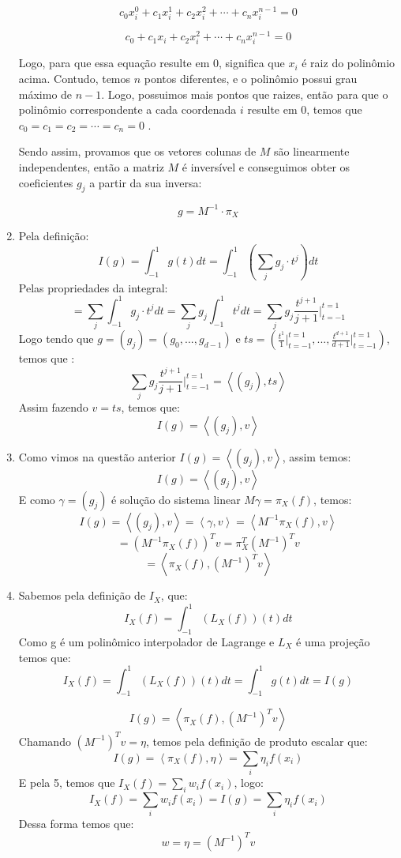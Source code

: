 \documentclass[12pt]{article}
\begin{document}
\begin{enumerate}[1.]
    
        $$ c_0 x_i ^0 + c_1 x_i^1 + c_2 x_i ^2 + \cdots + c_n x_i ^{n-1} =  0$$
     
        $$ c_0  + c_1 x_i + c_2 x_i ^2 + \cdots + c_n x_i ^{n-1} =  0$$
        
    Logo, para que essa equação resulte em $0$, significa que $x_i$ é raiz do polinômio acima. Contudo, temos $n$ pontos diferentes, e o polinômio possui grau máximo de $n-1$. Logo, possuimos mais pontos que raizes, então para que o polinômio correspondente a cada coordenada $i$ resulte em $0$, temos que $c_0 = c_1 = c_2 = \cdots = c_n =0 $ .
    
    Sendo assim, provamos que os vetores colunas de $M$ são linearmente independentes, então a matriz $M$ é inversível e conseguimos obter os coeficientes $g_j$ a partir da sua inversa: 
    
     
     $$  g = M^{-1} \cdot  \pi _X $$
     
     
    \bigskip\bigskip
    \item Pela definição:
    \[ I(g) = \int_{-1}^{1} g(t)dt = \int_{-1}^{1} \left( \sum_j g_j \cdot t^j \right) dt \]
    Pelas propriedades da integral: 
    \[= \sum_j \int_{-1}^{1} g_j \cdot t^j dt = \sum_j g_j \int_{-1}^{1} t^j dt = \sum_j g_j \frac{t^{j+1}}{j+1} \bigg|_{t=-1}^{t=1} \]
    Logo tendo que $g= (g_j) = (g_0,..., g_{d-1})$ e $ts = \left (\frac{t^{1}}{1} \bigg|_{t=-1}^{t=1} ,...,\frac{t^{d+1}}{d+1} \bigg|_{t=-1}^{t=1} \right) $, temos que :
    \[\sum_j g_j \frac{t^{j+1}}{j+1} \bigg|_{t=-1}^{t=1} = \left<(g_j), ts \right> \]
    Assim fazendo $v= ts$, temos que:
    \[ I(g) = \left<(g_j),v \right> \]
    
    \bigskip\bigskip
    \item Como vimos na questão anterior $I(g) = \left<(g_j),v \right>$, assim temos:
    \[ I(g) = \left<(g_j),v \right> \]
    E como $\gamma =(g_j)$ é solução do sistema linear $M \gamma = \pi_X(f)$, temos:
    \[ I(g) = \left<(g_j),v \right> = \left<\gamma,v \right>  = \left< M^{-1} \pi_X(f),v \right>\]
    \[= \left( M^{-1} \pi_X(f) \right)^{T} v = \pi_X^{T} (M^{-1})^T v \]
    \[= \left< \pi_X(f),   (M^{-1})^T v \right>\]
    \bigskip\bigskip
    
    \item Sabemos pela definição de $I_X$, que:
    $$I_X(f) = \int_{-1}^{1}(L_X(f))(t)dt $$
    Como g é um polinômico interpolador de Lagrange e $L_X$ é uma projeção temos que:
    $$I_X(f) = \int_{-1}^{1}(L_X(f))(t)dt = \int_{-1}^{1}g(t)dt = I(g)$$
    
    \[I(g) = \left< \pi_X(f),   (M^{-1})^T v \right> \]
    Chamando $(M^{-1})^T v= \eta$, temos pela definição de produto escalar que:
    \[I(g) = \left< \pi_X(f),   \eta \right>  = \sum_{i} \eta_i f(x_i) \]
    E pela 5, temos que $I_X(f) = \sum_{i} w_i f(x_i) $, logo:
    \[I_X(f)= \sum_{i} w_i f(x_i) = I(g) = \sum_{i} \eta_i f(x_i)\]
    Dessa forma temos que:  
    \[w = \eta= (M^{-1})^T v \]
    

\end{enumerate}
\end{document}
